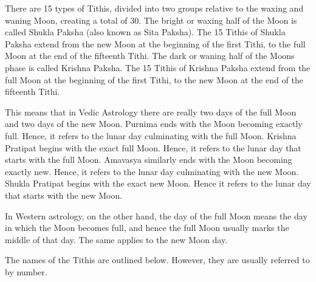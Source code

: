  

There are 15 types of Tithis, divided into two groups relative to the waxing and waning Moon, creating a total of 30. The bright or waxing half of the Moon is called Shukla Paksha (also known as Sita Paksha). The 15 Tithis of Shukla Paksha extend from the new Moon at the beginning of the first Tithi, to the full Moon at the end of the fifteenth Tithi. The dark or waning half of the Moons phase is called Krishna Paksha. The 15 Tithis of Krishna Paksha extend from the full Moon at the beginning of the first Tithi, to the new Moon at the end of the fifteenth Tithi.

 

This means that in Vedic Astrology there are really two days of the full Moon and two days of the new Moon. Purnima ends with the Moon becoming exactly full. Hence, it refers to the lunar day culminating with the full Moon. Krishna Pratipat begins with the exact full Moon. Hence, it refers to the lunar day that starts with the full Moon. Amavasya similarly ends with the Moon becoming exactly new. Hence, it refers to the lunar day culminating with the new Moon. Shukla Pratipat begins with the exact new Moon. Hence it refers to the lunar day that starts with the new Moon.

 

In Western astrology, on the other hand, the day of the full Moon means the day in which the Moon becomes full, and hence the full Moon usually marks the middle of that day. The same applies to the new Moon day.

 

The names of the Tithis are outlined below. However, they are usually referred to by number.

